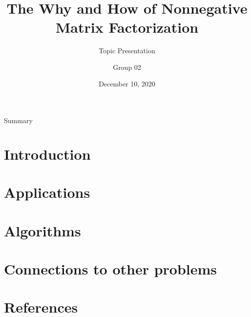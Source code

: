 \documentclass[aspectratio=43]{beamer}
\title[Nonnegative Matrix Factorization]{The Why and How of Nonnegative Matrix Factorization} %
\subtitle{Topic Presentation}
\author[Group 02]{Group 02}
\institute[LINMA2380]{
    LINMA2380 --- Matrix computations
} %
\date{December 10, 2020}
\begin{document}
    
    \frame{\titlepage}
        
    \begin{frame}{Summary}
        \tableofcontents
    \end{frame}
    
    \section{Introduction}
    
    
	\section{Applications}
    
    
    \section{Algorithms}
    
    
	\section{Connections to other problems}
	
	
	\section*{References}
  	\begin{frame}
  	\printbibliography
  	\end{frame}
\end{document}
